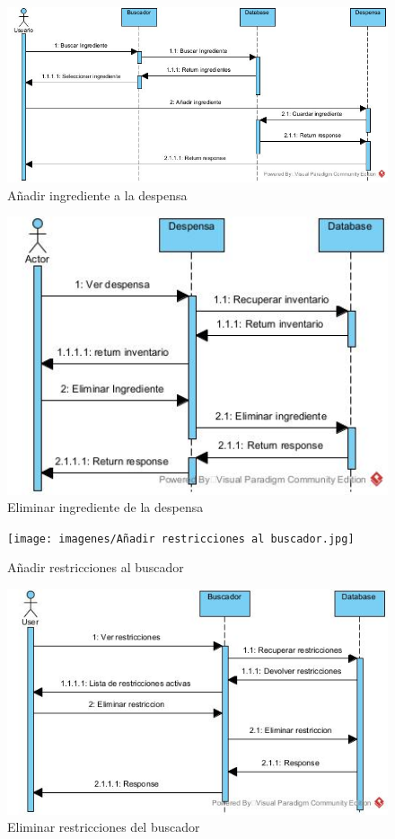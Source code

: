 \begin{figure}[h!]
\centering
\includegraphics[width=125mm,scale=1]{imagenes/Introducir ingrediente.jpg}
\caption{Añadir ingrediente a la despensa}
\label{fig:addIngrediente}
\end{figure}
\begin{figure}[h!]
\centering
\includegraphics[width=125mm,scale=1]{imagenes/Eliminar ingrediente.jpg}
\caption{Eliminar ingrediente de la despensa}
\label{fig:buscar}
\end{figure}
\begin{figure}[h!]
\centering
\texttt{[image: imagenes/Añadir restricciones al buscador.jpg]}
\caption{Añadir restricciones al buscador}
\label{fig:aniadir_restricciones}
\end{figure}
\begin{figure}[h!]
\centering
\includegraphics[width=125mm,scale=1]{imagenes/Eliminar restricciones.jpg}
\caption{Eliminar restricciones del buscador}
\label{fig:eliminar_restricciones}
\end{figure}